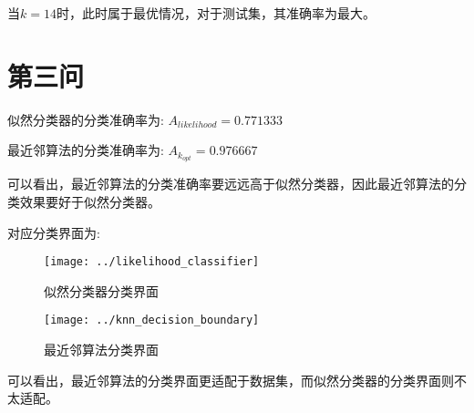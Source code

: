 \documentclass[UTF8]{article} %
\begin{document}
    当$k = 14$时，此时属于最优情况，对于测试集，其准确率为最大。


    \section{第三问}

    似然分类器的分类准确率为: $A_{likelihood} = 0.771333$

    最近邻算法的分类准确率为: $A_{k_{opt}} = 0.976667$

    可以看出，最近邻算法的分类准确率要远远高于似然分类器，因此最近邻算法的分类效果要好于似然分类器。

    对应分类界面为:

    \begin{figure}[htbp]
        \begin{minipage}[t]{0.5\linewidth}
            \centering
            \texttt{[image: ../likelihood\_classifier]}
            \caption{似然分类器分类界面}
        \end{minipage}%
        \begin{minipage}[t]{0.5\linewidth}
            \centering
            \texttt{[image: ../knn\_decision\_boundary]}
            \caption{最近邻算法分类界面}
        \end{minipage}
    \end{figure}

    可以看出，最近邻算法的分类界面更适配于数据集，而似然分类器的分类界面则不太适配。
\end{document}
